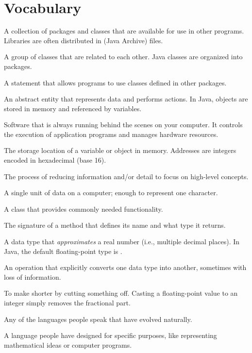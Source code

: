 \section{Vocabulary}

\begin{description}

A collection of packages and classes that are available for use in other programs.
Libraries are often distributed in  (Java Archive) files.

A group of classes that are related to each other.
Java classes are organized into packages.

A statement that allows programs to use classes defined in other packages.

An abstract entity that represents data and performs actions.
In Java, objects are stored in memory and referenced by variables.

Software that is always running behind the scenes on your computer.
It controls the execution of application programs and manages hardware resources.

The storage location of a variable or object in memory.
Addresses are integers encoded in hexadecimal (base 16).

The process of reducing information and/or detail to focus on high-level concepts.

A single unit of data on a computer; enough to represent one character.

A class that provides commonly needed functionality.

The signature of a method that defines its name and what type it returns.

A data type that {\em approximates} a real number (i.e., multiple decimal places).
In Java, the default floating-point type is .

An operation that explicitly converts one data type into another, sometimes with loss of information.

To make shorter by cutting something off.
Casting a floating-point value to an integer simply removes the fractional part.

Any of the languages people speak that have evolved naturally.

A language people have designed for specific purposes, like representing mathematical ideas or computer programs.


\end{description}
